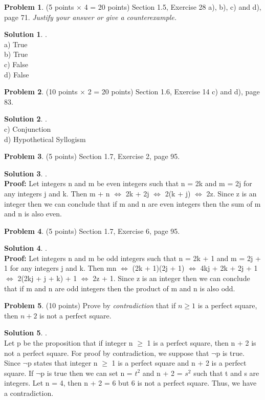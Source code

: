 \documentclass{article}
\theoremstyle{definition}
\newtheorem{problem}{Problem}
\newtheorem*{solution}{Solution}
\begin{document}
\begin{problem} (5 points $\times$ 4 = 20 points) Section 1.5, Exercise 28 a), b), c) and d), page 71. 
\textsl{Justify your answer or give a counterexample.}
\end{problem}
\begin{solution}.\\
a) True\\
b) True\\
c) False\\
d) False\\
\end{solution}

\begin{problem} (10 points $\times$ 2 = 20 points) Section 1.6, Exercise 14 c) and d), page 83.
\end{problem}
\begin{solution}.\\
c) Conjunction\\
d) Hypothetical Syllogism
\end{solution}

\begin{problem} (5 points) Section 1.7, Exercise 2, page 95. 
\end{problem}
\begin{solution}.\\
\textbf{Proof:} Let integers n and m be even integers such that n = 2k and m = 2j for any integers j and k. Then m + n $\iff$ 2k + 2j $\iff$ 2(k + j) $\iff$ 2z. Since z is an integer then we can conclude that if m and n are even integers then the sum of m and n is also even.
\end{solution}

\begin{problem} (5 points) Section 1.7, Exercise 6, page 95.  
\end{problem}
\begin{solution}.\\
\textbf{Proof:} Let integers n and m be odd integers such that n = 2k + 1 and m = 2j + 1 for any integers j and k. Then mn $\iff$ (2k + 1)(2j + 1) $\iff$ 4kj + 2k + 2j + 1 $\iff$ 2(2kj + j + k) + 1 $\iff$ 2z + 1. Since z is an integer then we can conclude that if m and n are odd integers then the product of m and n is also odd. 
\end{solution}

\begin{problem} (10 points) Prove by \textit{contradiction} that 
if $n\ge 1$ is a perfect square, then $n+2$ is not a perfect square. 
\end{problem}
\begin{solution}.\\
Let p be the proposition that if integer n $\geq$ 1 is a perfect square, then n + 2 is not a perfect square. For proof by contradiction, we suppose that $\neg$p is true. Since $\neg$p states that integer n $\geq$ 1 is a perfect square and n + 2 is a perfect square. If $\neg$p is true then we can set n = $t^{2}$ and n + 2 = $s^{2}$ such that t and s are integers. Let n = 4, then n + 2 = 6 but 6 is not a perfect square. Thus, we have a contradiction.
\end{solution}
\end{document}
